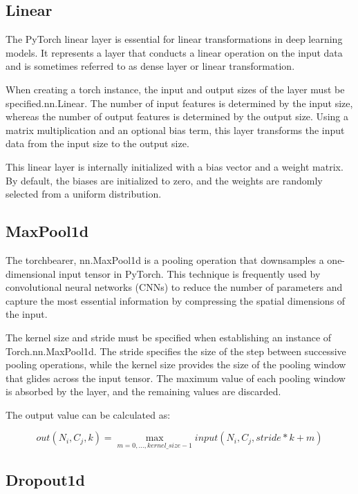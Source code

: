 \subsection{Linear}

The PyTorch linear layer is essential for linear transformations in deep learning models. It represents a layer that conducts a linear operation on the input data and is sometimes referred to as dense layer or linear transformation.

When creating a torch instance, the input and output sizes of the layer must be specified.nn.Linear. The number of input features is determined by the input size, whereas the number of output features is determined by the output size. Using a matrix multiplication and an optional bias term, this layer transforms the input data from the input size to the output size.


This linear layer is internally initialized with a bias vector and a weight matrix. By default, the biases are initialized to zero, and the weights are randomly selected from a uniform distribution.


\subsection{MaxPool1d}

The torchbearer, nn.MaxPool1d is a pooling operation that downsamples a one-dimensional input tensor in PyTorch. This technique is frequently used by convolutional neural networks (CNNs) to reduce the number of parameters and capture the most essential information by compressing the spatial dimensions of the input.



The kernel size and stride must be specified when establishing an instance of \\ Torch.nn.MaxPool1d. The stride specifies the size of the step between successive pooling operations, while the kernel size provides the size of the pooling window that glides across the input tensor. The maximum value of each pooling window is absorbed by the layer, and the remaining values are discarded.


The output value can be calculated as:

\begin{equation}
    out(N_i, C_j, k) = \max_{m=0,...,kernel\_size-1} input(N_i, C_j, stride * k + m)
\end{equation}


\subsection{Dropout1d}

